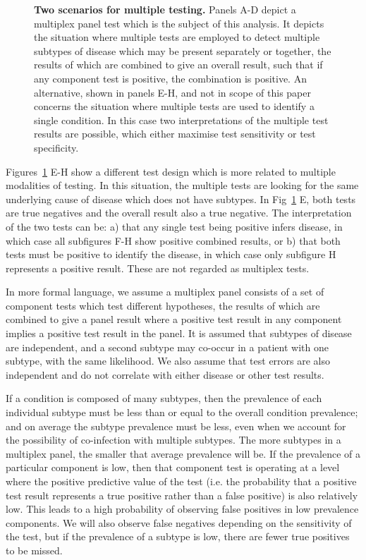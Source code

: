 \documentclass[10pt,letterpaper]{article}
\begin{document}
\begin{figure}[!ht]
\caption{{\bf Two scenarios for multiple testing.}
Panels A-D depict a multiplex panel test which is the subject of this analysis. It depicts the situation where multiple tests are employed to detect multiple subtypes of disease which may be present separately or together, the results of which are combined to give an overall result, such that if any component test is positive, the combination is positive. An alternative, shown in panels E-H, and not in scope of this paper concerns the situation where multiple tests are used to identify a single condition. In this case two interpretations of the multiple test results are possible, which either maximise test sensitivity or test specificity.}
\label{fig1}
\end{figure}

Figures~\ref{fig1} E-H show a different test design which is more related to multiple modalities of testing\cite{weinstein2005}. In this situation, the multiple tests are looking for the same underlying cause of disease which does not have subtypes. In Fig~\ref{fig1} E, both tests are true negatives and the overall result also a true negative. The interpretation of the two tests can be: a) that any single test being positive infers disease, in which case all subfigures F-H show positive combined results, or b) that both tests must be positive to identify the disease, in which case only subfigure H represents a positive result. These are not regarded as multiplex tests.

In more formal language, we assume a multiplex panel consists of a set of component tests which test different hypotheses, the results of which are combined to give a panel result where a positive test result in any component implies a positive test result in the panel. It is assumed that subtypes of disease are independent, and a second subtype may co-occur in a patient with one subtype, with the same likelihood. We also assume that test errors are also independent and do not correlate with either disease or other test results.

If a condition is composed of many subtypes, then the prevalence of each individual subtype must be less than or equal to the overall condition prevalence; and on average the subtype prevalence must be less, even when we account for the possibility of co-infection with multiple subtypes. The more subtypes in a multiplex panel, the smaller that average prevalence will be. If the prevalence of a particular component is low, then that component test is operating at a level where the positive predictive value of the test (i.e. the probability that a positive test result represents a true positive rather than a false positive) is also relatively low. This leads to a high probability of observing false positives in low prevalence components. We will also observe false negatives depending on the sensitivity of the test, but if the prevalence of a subtype is low, there are fewer true positives to be missed.
\end{document}
